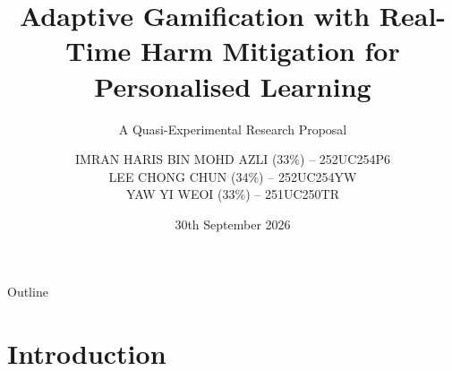 \documentclass[10pt]{beamer}
\begin{document}
\title[Adaptive Harm-Aware Gamification]{Adaptive Gamification with Real-Time Harm Mitigation for Personalised Learning}
\subtitle{A Quasi-Experimental Research Proposal}
\author[Imran \quad Lee \quad Yaw]{
    \small IMRAN HARIS BIN MOHD AZLI (33\%) -- 252UC254P6\\[1pt]
    \small LEE CHONG CHUN (34\%) -- 252UC254YW\\[1pt]
    \small YAW YI WEOI (33\%) -- 251UC250TR
}
\date{30th September 2026}

\begin{frame}
\titlepage
\end{frame}

\begin{frame}{Outline}
\tableofcontents
\end{frame}


\section{Introduction}
\end{document}
